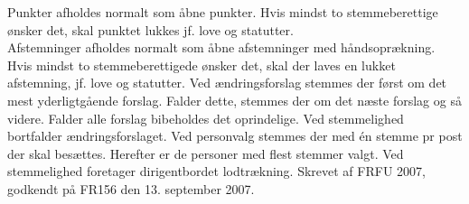 Punkter afholdes normalt som åbne punkter. Hvis mindst to stemmeberettige ønsker det, skal punktet lukkes jf. love og
statutter.\\

Afstemninger afholdes normalt som åbne afstemninger med håndsoprækning. Hvis mindst to stemmeberettigede ønsker
det, skal der laves en lukket afstemning, jf. love og statutter.
Ved ændringsforslag stemmes der først om det mest yderligtgående forslag. Falder dette, stemmes der om det næste
forslag og så videre. Falder alle forslag bibeholdes det oprindelige. Ved stemmelighed bortfalder ændringsforslaget.
Ved personvalg stemmes der med én stemme pr post der skal besættes. Herefter er de personer med flest stemmer valgt.
Ved stemmelighed foretager dirigentbordet lodtrækning.
Skrevet af FRFU 2007, godkendt på FR156 den 13. september 2007.